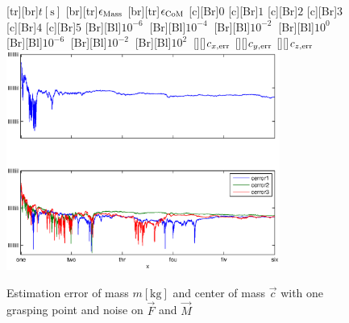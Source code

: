 \begin{figure}
	\centering	
	[tr][br]{$t\left[\mathrm{s}\right]$}
	[br][tr]{$\epsilon_{\mathrm{Mass}}$}
	[br][tr]{$\epsilon_{\mathrm{CoM}}$}
	[Br]{$0$}
	[Br]{$1$}
	[Br]{$2$}
	[Br]{$3$}
	[Br]{$4$}
	[Br]{$5$}
	[Br][Bl]{$10^{-6}\  $}
	[Br][Bl]{$10^{-4}\  $}
	[Br][Bl]{$10^{-2}\  $}
	[Br][Bl]{$10^0\  $}
	[Br][Bl]{$10^{-6}\  $}
	[Br][Bl]{$10^{-2}\  $}
	[Br][Bl]{$10^{2}\  $}
	[][]{\tiny $c_{x,\mathrm{err}}$}
	[][]{\tiny $c_{y,\mathrm{err}}$}
	[][]{\tiny $c_{z,\mathrm{err}}$}
	\includegraphics[width=0.8\textwidth]{figures/mass_noise.eps}
	\vspace{0.2cm}
	\caption[Mass error, noise]{Estimation error of mass $m \left[\mathrm{kg}\right]$ and center of mass $\vec{c}$ with one grasping point and noise on $\vec F$ and $\vec M$}
	\label{fig:estim_mass_noise}
\end{figure}

